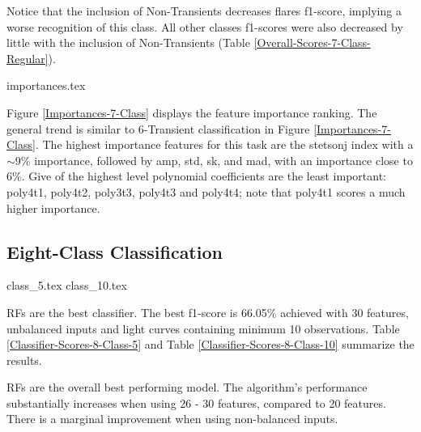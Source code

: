 \documentclass[a4paper,fleqn,usenatbib]{mnras}
\begin{document}
Notice that the inclusion of Non-Transients decreases flares f1-score,
implying a worse recognition of this class. All other classes
f1-scores were also decreased by little with the inclusion of
Non-Transients (Table \ref{Overall-Scores-7-Class-Regular}). 


{importances.tex}

Figure \ref{Importances-7-Class} displays the feature importance
ranking. 
The general trend is similar to 6-Transient classification in Figure
\ref{Importances-7-Class}. 
The highest importance features for this task are the
stetson\textunderscore j index with a $\sim$9\% importance, followed by
amp, std, sk, and mad, with an importance close to 6\%. 
Give of the highest level polynomial coefficients are the least
important: poly4\textunderscore t1, poly4\textunderscore t2,
poly3\textunderscore t3, poly4\textunderscore t3 and
poly4\textunderscore t4; note that poly4\textunderscore t1 scores a
much higher importance.  





\subsection{Eight-Class Classification}

{class_5.tex}
{class_10.tex}


RFs are the best classifier. The best f1-score is 66.05\% achieved with
30 features, unbalanced inputs and light curves containing minimum 10
observations.  
Table \ref{Classifier-Scores-8-Class-5} and Table
\ref{Classifier-Scores-8-Class-10} summarize the results.

RFs are the overall best performing model.
The algorithm's performance substantially increases when using 26 -
30 features, compared to 20 features.
There is a marginal improvement when using non-balanced inputs. 
\end{document}
